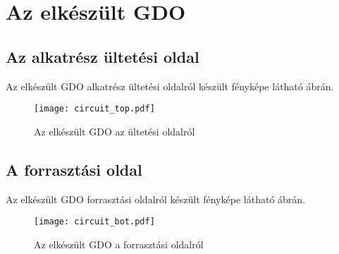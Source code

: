 \section{Az elkészült GDO}

\subsection{Az alkatrész ültetési oldal}

Az elkészült GDO alkatrész ültetési oldalról készült fényképe látható  ábrán.

\begin{figure}[!ht]
\centering
\texttt{[image: circuit\_top.pdf]}
\caption{Az elkészült GDO az ültetési oldalról}
\label{fig:circtop} 
\end{figure}

\subsection{A forrasztási oldal}

Az elkészült GDO forrasztási oldalról készült fényképe látható  ábrán.

\begin{figure}[!ht]
\centering
\texttt{[image: circuit\_bot.pdf]}
\caption{Az elkészült GDO a forrasztási oldalról}
\label{fig:circbot} 
\end{figure}

